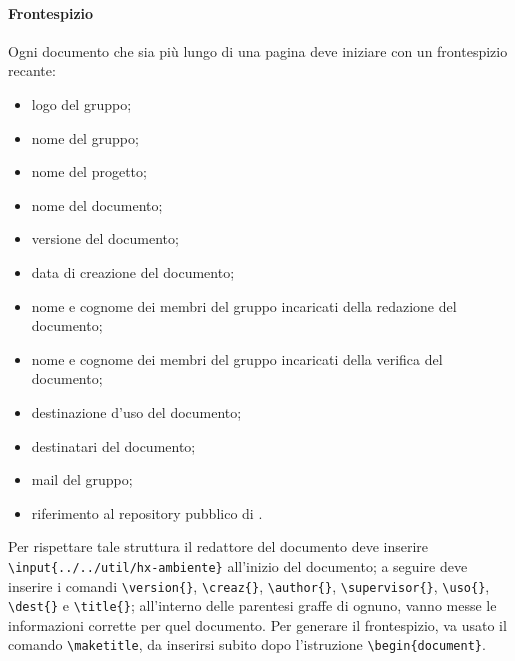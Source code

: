 \paragraph{Frontespizio} Ogni documento che sia più lungo di una pagina deve iniziare con un frontespizio recante:
\begin{itemize}
	\item logo del gruppo;
	\item nome del gruppo;
	\item nome del progetto;
	\item nome del documento;
	\item versione del documento;
	\item data di creazione del documento;
	\item nome e cognome dei membri del gruppo incaricati della redazione del documento;
	\item nome e cognome dei membri del gruppo incaricati della verifica del documento;
	\item destinazione d'uso del documento;
	\item destinatari del documento;
	\item mail del gruppo;
	\item riferimento al repository pubblico di .
\end{itemize} 
Per rispettare tale struttura il redattore del documento deve inserire \\\texttt{\textbackslash input\{../../util/hx-ambiente\}} all'inizio del documento; a seguire deve inserire i comandi \texttt{\textbackslash version\{\}}, \texttt{\textbackslash creaz\{\}}, \texttt{\textbackslash author\{\}}, \texttt{\textbackslash supervisor\{\}}, \texttt{\textbackslash uso\{\}}, \texttt{\textbackslash dest\{\}} e \texttt{\textbackslash title\{\}}; all'interno delle parentesi graffe di ognuno, vanno messe le informazioni corrette per quel documento. Per generare il frontespizio, va usato il comando \texttt{\textbackslash maketitle}, da inserirsi subito dopo l'istruzione \texttt{\textbackslash begin\{document\}}.

